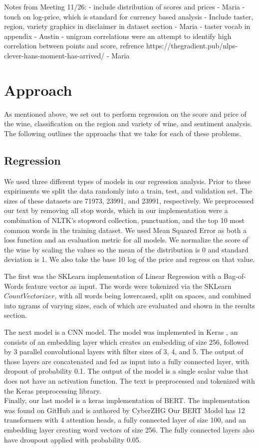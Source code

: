 \documentclass[11pt]{article}
\begin{document}
    Notes from Meeting 11/26:
    - include distribution of scores and prices - Maria
        - touch on log-price, which is standard for currency based analysis
    - Include taster, region, variety graphics in disclaimer in dataset section - Maria
    - taster vocab in appendix - Austin
    - unigram correlations were an attempt to identify high correlation between points and score, refrence https://thegradient.pub/nlps-clever-hans-moment-has-arrived/ - Maria

\section{Approach}
    As mentioned above, we set out to perform regression on the score and price of the wine, classification on the region and variety of wine, and sentiment analysis. The following outlines the approachs that we take for each of these problems.

\subsection{Regression}
    We used three different types of models in our regression analysis. Prior to these expiriments we split the data randomly into a train, test, and validation set. The sizes of these datasets are 71973, 23991, and 23991, respectively. We preprocessed our text by removing all stop words, which in our implementation were a combination of NLTK's stopword collection, punctuation, and the top 10 most common words in the training dataset. We used Mean Squared Error as both a loss function and an evaluation metric for all models. We normalize the score of the wine by scaling the values so the mean of the distribution is 0 and standard deviation is 1. We also take the base 10 log of the price and regress on that value. \par
    The first was the SKLearn implementation of Linear Regression with a Bag-of-Words feature vector as input. The words were tokenized via the SKLearn $CountVectorizer$, with all words being lowercased, split on spaces, and combined into ngrams of varying sizes, each of which are evaluated and shown in the results section. \par
    The next model is a CNN model. The model was implemented in Keras \cite{keras}, an consists of an embedding layer which creates an embedding of size 256, followed by 3 parallel convolutional layers with filter sizes of 3, 4, and 5. The output of those layers are concatenated and fed as input into a fully connected layer, with dropout of probability 0.1. The output of the model is a single scalar value that does not have an activation function. The text is preprocessed and tokenized with the Keras preprocessing library. \\
    Finally, our last model is a keras \cite{keras} implementation of BERT. The implementation was found on GitHub and is authored by CyberZHG \cite{keras_bert} Our BERT Model has 12 transformers with 4 attention heads, a fully connected layer of size 100, and an embedding layer creating word vectors of size 256. The fully connected layers also have droupout applied with probability 0.05.
\end{document}
